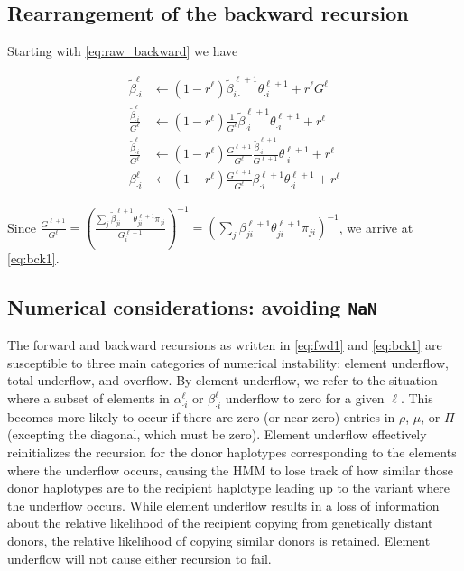 \documentclass[a4paper]{article}
\providecommand{\DIFadd}[1]{{\protect\color{blue}\uwave{#1}}} %
\providecommand{\DIFdel}[1]{{\protect\color{red}\sout{#1}}}                      %
\providecommand{\DIFaddbegin}{} %
\providecommand{\DIFaddend}{} %
\providecommand{\DIFdelbegin}{} %
\providecommand{\DIFdelend}{} %
\newcommand{\DIFscaledelfig}{0.5}
\newlength{\DIFdelgraphicswidth} %
\newlength{\DIFdelgraphicsheight} %
\newcommand{\DIFaddincludegraphics}[2][]{{\color{blue}\fbox{\DIFOincludegraphics[#1]{#2}}}} %
\newcommand{\DIFdelincludegraphics}[2][]{%
\sbox{\DIFdelgraphicsbox}{\DIFOincludegraphics[#1]{#2}}%
\settoboxwidth{\DIFdelgraphicswidth}{\DIFdelgraphicsbox} %
\settoboxtotalheight{\DIFdelgraphicsheight}{\DIFdelgraphicsbox} %
\scalebox{\DIFscaledelfig}{%
\parbox[b]{\DIFdelgraphicswidth}{\usebox{\DIFdelgraphicsbox}\\[-\baselineskip] \rule{\DIFdelgraphicswidth}{0em}}\llap{\resizebox{\DIFdelgraphicswidth}{\DIFdelgraphicsheight}{%
\setlength{\unitlength}{\DIFdelgraphicswidth}%
\begin{picture}(1,1)%
\thicklines\linethickness{2pt} %
{\color[rgb]{1,0,0}\put(0,0){\framebox(1,1){}}}%
{\color[rgb]{1,0,0}\put(0,0){\line( 1,1){1}}}%
{\color[rgb]{1,0,0}\put(0,1){\line(1,-1){1}}}%
\end{picture}%
}\hspace*{3pt}}} %
} %
\DeclareRobustCommand{\DIFaddbegin}{\DIFOaddbegin \let\includegraphics\DIFaddincludegraphics} %
\DeclareRobustCommand{\DIFaddend}{\DIFOaddend \let\includegraphics\DIFOincludegraphics} %
\DeclareRobustCommand{\DIFdelbegin}{\DIFOdelbegin \let\includegraphics\DIFdelincludegraphics} %
\DeclareRobustCommand{\DIFdelend}{\DIFOaddend \let\includegraphics\DIFOincludegraphics} %
\begin{document}
\subsection{Rearrangement of the backward recursion}
\label{apx:bck}

Starting with \eqref{eq:raw_backward} we have

\begin{align}
	\tilde{\beta}_{\cdot i}^{\ell} &\gets \left( 1- r^{\ell}\right) \tilde{\beta}_{i\cdot}^{\ell+1} \theta^{\ell+1}_{\cdot i} + r^{\ell} G^\ell \nonumber \\
	\frac{\tilde{\beta}_{\cdot i}^{\ell}}{G^{\ell}} &\gets \left( 1- r^{\ell}\right) \frac{1}{G^{\ell}} \tilde{\beta}_{\cdot i}^{\ell+1} \theta^{\ell+1}_{\cdot i} + r^\ell \nonumber \\
	\frac{\tilde{\beta}_{\cdot i}^{\ell}}{ G^{\ell}} &\gets \left( 1- r^{\ell}\right) \frac{G^{\ell+1}}{G^{\ell}} \frac{\tilde{\beta}_{\cdot i}^{\ell+1}}{G^{\ell+1}} \theta^{\ell+1}_{\cdot i} + r^\ell \nonumber \\
	\beta_{\cdot i}^{\ell} &\gets \left( 1- r^{\ell}\right) \frac{G^{\ell+1}}{ G^{\ell}} \beta_{\cdot i}^{\ell+1} \theta^{\ell+1}_{\cdot i} + r^\ell \nonumber
\end{align}

Since
\DIFdelbegin \DIFdel{\(\frac{G^{\ell+1}}{ G^{\ell}} = \left( \frac{\underset{j}{\sum} \tilde{\beta}_{ji}^{\ell+1}\theta_{ji}^{\ell+1} \pi_{ji} }{G_i^{\ell+1}}\right)^{-1} = \left(\underset{j}{\sum} \beta_{ji}^{\ell+1}\theta_{ji}^{\ell+1} \pi_{ji}\right)^{-1}\)}\DIFdelend \DIFaddbegin \DIFadd{\(\frac{G^{\ell+1}}{ G^{\ell}} = \left( \frac{\underset{j}{\sum} \tilde{\beta}_{ji}^{\ell+1}\theta_{ji}^{\ell+1} \Pi_{ji} }{G_i^{\ell+1}}\right)^{-1} = \left(\underset{j}{\sum} \beta_{ji}^{\ell+1}\theta_{ji}^{\ell+1} \Pi_{ji}\right)^{-1}\)}\DIFaddend ,
we arrive at \eqref{eq:bck1}.

\subsection[Numerical considerations: avoiding NaN]{Numerical considerations: avoiding \texttt{NaN}}
\label{apx:nan}

The forward and backward recursions as written in \eqref{eq:fwd1} and \eqref{eq:bck1} are susceptible to three main categories of numerical instability: element underflow, total underflow, and overflow.
By element underflow, we refer to the situation where a subset of elements in \(\alpha_{\cdot i}^\ell\) or \(\beta_{\cdot i}^\ell\) underflow to zero for a given \(\ell\).
This becomes more likely to occur if there are zero (or near zero) entries in \(\rho\), \(\mu\), or \(\Pi\) (excepting the diagonal, which must be zero).
Element underflow effectively reinitializes the recursion for the donor haplotypes corresponding to the elements where the underflow occurs, causing the HMM to lose track of how similar those donor haplotypes are
to the recipient haplotype leading up to the variant where the underflow occurs.
While element underflow results in a loss of information about the relative likelihood of the recipient copying from genetically distant donors, the relative likelihood of copying similar donors is retained.
Element underflow will not cause either recursion to fail.
\end{document}
